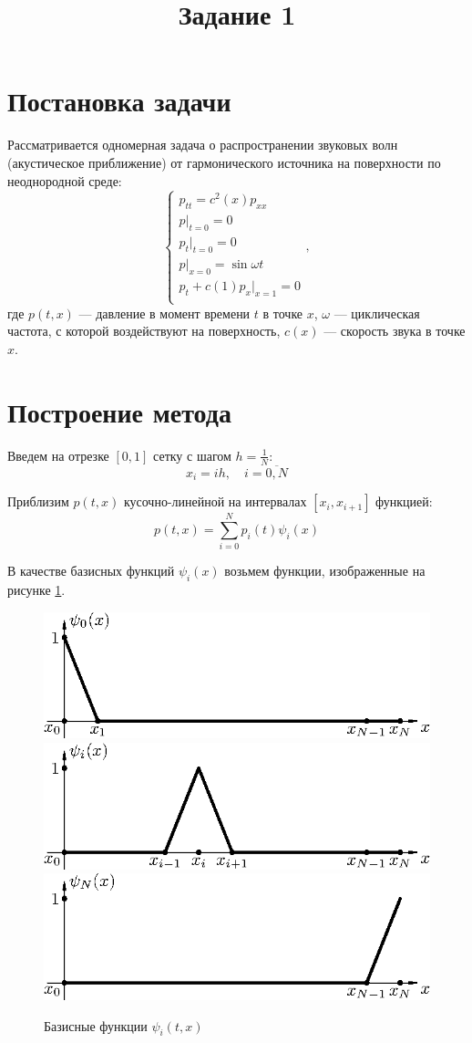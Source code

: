 \documentclass[12pt]{article}
\title{Задание 1}
\date{}
\begin{document}
\maketitle

\section{Постановка задачи}
Рассматривается одномерная задача о распространении звуковых волн (акустическое приближение) от
гармонического источника на поверхности по неоднородной среде:
\[
\begin{cases}
p_{tt} = c^2(x) p_{xx}\\
p\big|_{t = 0} = 0\\
p_t\big|_{t = 0} = 0\\
p\big|_{x = 0} = \sin \omega t\\
p_t + c(1) p_x \big|_{x = 1} = 0\\
\end{cases},
\]
где $p(t, x)$ --- давление в момент времени $t$ в точке $x$, $\omega$ ---
циклическая частота, с которой воздействуют на поверхность, $c(x)$ --- скорость
звука в точке $x$.

\section{Построение метода}

Введем на отрезке $[0, 1]$ сетку с шагом $h = \frac{1}{N}$: 
\[
x_i = ih, \quad i =\overline{0, N}
\]

Приблизим $p(t, x)$ кусочно-линейной на интервалах $[x_i, x_{i+1}]$ функцией:
\[
p(t, x) = \sum_{i = 0}^N p_i(t) \psi_i(x)
\]

В качестве базисных функций $\psi_i(x)$ возьмем функции, изображенные на рисунке \ref{pic:1}.
\begin{figure}[!ht]
\centering
\includegraphics[width=.5\textwidth]{box-0.eps}\\
\includegraphics[width=.5\textwidth]{box-1.eps}\\
\includegraphics[width=.5\textwidth]{box-2.eps}%
\caption{Базисные функции $\psi_i(t,x)$}
\label{pic:1}
\end{figure}
\end{document}
